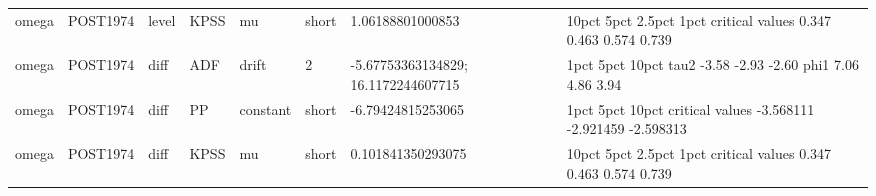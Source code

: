 \begin{tabular}{llllllll}
omega & POST1974 & level & KPSS & mu & short & 1.06188801000853 &                 10pct  5pct 2.5pct  1pct critical values 0.347 0.463  0.574 0.739 \\
omega & POST1974 & diff & ADF & drift & 2 & -5.67753363134829; 16.1172244607715 &       1pct  5pct 10pct tau2 -3.58 -2.93 -2.60 phi1  7.06  4.86  3.94 \\
omega & POST1974 & diff & PP & constant & short & -6.79424815253065 &                      1pct      5pct     10pct critical values -3.568111 -2.921459 -2.598313 \\
omega & POST1974 & diff & KPSS & mu & short & 0.101841350293075 &                 10pct  5pct 2.5pct  1pct critical values 0.347 0.463  0.574 0.739 \\
\hline
\end{tabular}
